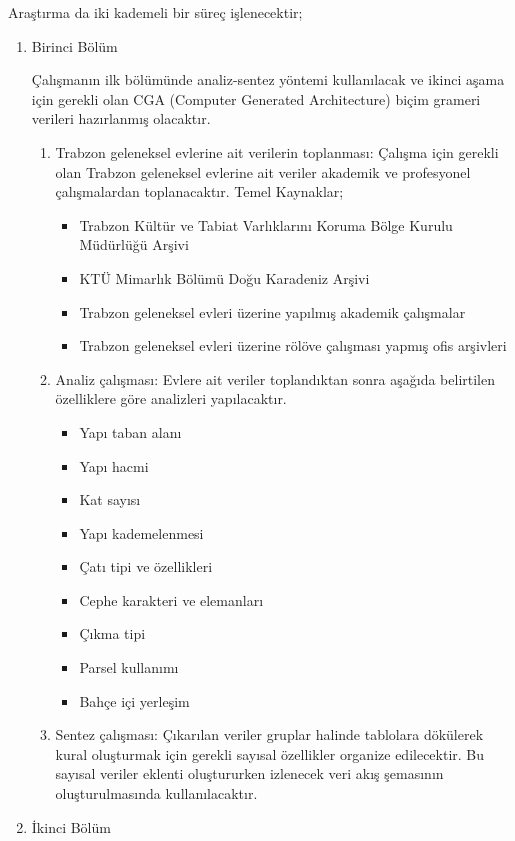 \documentclass[12pt,turkish,a4paperpaper,]{report}
\providecommand{\tightlist}{%
  \setlength{\itemsep}{0pt}\setlength{\parskip}{0pt}}
\begin{document}
Araştırma da iki kademeli bir süreç işlenecektir;

\begin{enumerate}
\def\labelenumi{\arabic{enumi}.}
\item
  Birinci Bölüm

  Çalışmanın ilk bölümünde analiz-sentez yöntemi kullanılacak ve ikinci
  aşama için gerekli olan CGA (Computer Generated Architecture) biçim
  grameri verileri hazırlanmış olacaktır.

  \begin{enumerate}
  \def\labelenumii{\arabic{enumii}.}
  \item
    Trabzon geleneksel evlerine ait verilerin toplanması: Çalışma için
    gerekli olan Trabzon geleneksel evlerine ait veriler akademik ve
    profesyonel çalışmalardan toplanacaktır. Temel Kaynaklar;

    \begin{itemize}
    \tightlist
    \item
      Trabzon Kültür ve Tabiat Varlıklarını Koruma Bölge Kurulu
      Müdürlüğü Arşivi
    \item
      KTÜ Mimarlık Bölümü Doğu Karadeniz Arşivi
    \item
      Trabzon geleneksel evleri üzerine yapılmış akademik çalışmalar
    \item
      Trabzon geleneksel evleri üzerine rölöve çalışması yapmış ofis
      arşivleri
    \end{itemize}
  \item
    Analiz çalışması: Evlere ait veriler toplandıktan sonra aşağıda
    belirtilen özelliklere göre analizleri yapılacaktır.

    \begin{itemize}
    \item
      Yapı taban alanı
    \item
      Yapı hacmi
    \item
      Kat sayısı
    \item
      Yapı kademelenmesi
    \item
      Çatı tipi ve özellikleri
    \item
      Cephe karakteri ve elemanları
    \item
      Çıkma tipi
    \item
      Parsel kullanımı
    \item
      Bahçe içi yerleşim
    \end{itemize}
  \item
    Sentez çalışması: Çıkarılan veriler gruplar halinde tablolara
    dökülerek kural oluşturmak için gerekli sayısal özellikler organize
    edilecektir. Bu sayısal veriler eklenti oluştururken izlenecek veri
    akış şemasının oluşturulmasında kullanılacaktır.
  \end{enumerate}
\item
  İkinci Bölüm


\end{enumerate}
\end{document}
